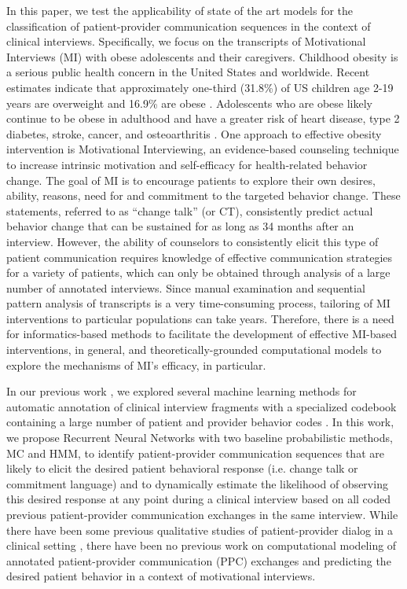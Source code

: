 \documentclass{amia_summit_2018}
\begin{document}
In this paper, we test the applicability of state of the art models for the classification of patient-provider communication sequences in the context of clinical interviews. Specifically, we focus on the transcripts of Motivational Interviews (MI) with obese adolescents and their caregivers. Childhood obesity is a serious public health concern in the United States and worldwide. Recent estimates indicate that approximately one-third (31.8\%) of US children age 2-19 years are overweight and 16.9\% are obese \cite{ogden2012prevalence}. Adolescents who are obese likely continue to be obese in adulthood and have a greater risk of heart disease, type 2 diabetes, stroke, cancer, and osteoarthritis \cite{general2010surgeon}. One approach to effective obesity intervention is Motivational Interviewing, an evidence-based counseling technique to increase intrinsic motivation and self-efficacy for health-related behavior change. The goal of MI is to encourage patients to explore their own desires, ability, reasons, need for and commitment to the targeted behavior change. These statements, referred to as ``change talk'' (or CT), consistently predict actual behavior change\cite{apodaca2009mechanisms} that can be sustained for as long as 34 months\cite{walker2011influence} after an interview. However, the ability of counselors to consistently elicit this type of patient communication requires knowledge of effective communication strategies for a variety of patients, which can only be obtained through analysis of a large number of annotated interviews. Since manual examination and sequential pattern analysis of transcripts is a very time-consuming process, tailoring of MI interventions to particular populations can take years. Therefore, there is a need for informatics-based methods to facilitate the development of effective MI-based interventions, in general, and theoretically-grounded computational models to explore the mechanisms of MI's efficacy, in particular.  


In our previous work \cite{kotov2015interpretable, hasan2016study}, we explored several machine learning methods for automatic annotation of clinical interview fragments with a specialized codebook containing a large number of patient and provider behavior codes \cite{carcone2013provider}. In this work, we propose Recurrent Neural Networks with two baseline probabilistic methods, MC and HMM, to identify patient-provider communication sequences that are likely to elicit the desired patient behavioral response (i.e. change talk or commitment language) and to dynamically estimate the likelihood of observing this desired response at any point during a clinical interview based on all coded previous patient-provider communication exchanges in the same interview. While there have been some previous qualitative studies of patient-provider dialog in a clinical setting \cite{eide2004physician}, there have been no previous work on computational modeling of annotated patient-provider communication (PPC) exchanges and predicting the desired patient behavior in a context of motivational interviews.   
\end{document}
